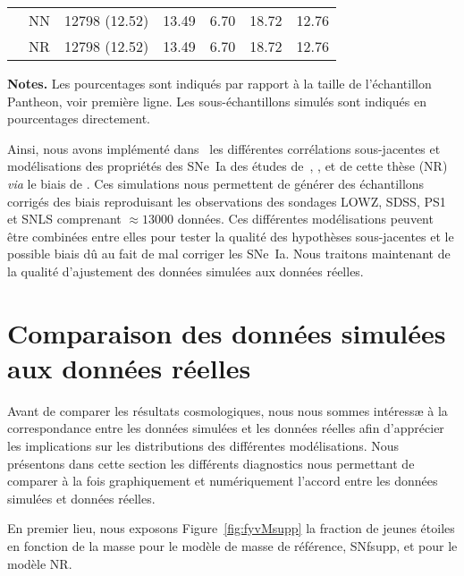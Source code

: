 \documentclass[../main/main.tex]{subfiles}
\begin{document}
\begin{table}[ht]
\begin{threeparttable}
{\begin{tabular}{ccccccc}
            & NN & 12798 (12.52) & 13.49 & 6.70 & 18.72 & 12.76 \\
            & NR & 12798 (12.52) & 13.49 & 6.70 & 18.72 & 12.76 \\
            \bottomrule
    \end{tabular}}
        \begin{tablenotes}[flushleft]
            \item \small \textbf{\hspace{-3,2pt}Notes.} Les pourcentages
                sont indiqués par rapport à la taille de l'échantillon
                Pantheon, voir première ligne. Les sous-échantillons simulés
                sont indiqués en pourcentages directement.
        \end{tablenotes}
    \end{threeparttable}
\end{table}


Ainsi, nous avons implémenté dans \snana\ les différentes corrélations
sous-jacentes et modélisations des propriétés des SNe~Ia des études
de~, , 
et de cette thèse (NR) \textit{via} le biais de \hostlib. Ces simulations nous
permettent de générer des échantillons corrigés des biais reproduisant les
observations des sondages LOWZ, SDSS, PS1 et SNLS comprenant $\approx
\num{13000}$ données. Ces différentes modélisations peuvent être combinées entre
elles pour tester la qualité des hypothèses sous-jacentes et le possible biais
dû au fait de mal corriger les SNe~Ia. Nous traitons maintenant de la qualité
d'ajustement des données simulées aux données réelles.

\section{Comparaison des données simulées aux données réelles}\label{sec:simcomp}

Avant de comparer les résultats cosmologiques, nous nous sommes intéressæ à la
correspondance entre les données simulées et les données réelles afin
d'apprécier les implications sur les distributions des différentes
modélisations. Nous présentons dans cette section les différents diagnostics
nous permettant de comparer à la fois graphiquement et numériquement l'accord
entre les données simulées et données réelles.

En premier lieu, nous exposons Figure~\ref{fig:fyvMsupp} la fraction de jeunes
étoiles en fonction de la masse pour le modèle de masse de référence, SNfsupp,
et pour le modèle NR.
\end{document}
